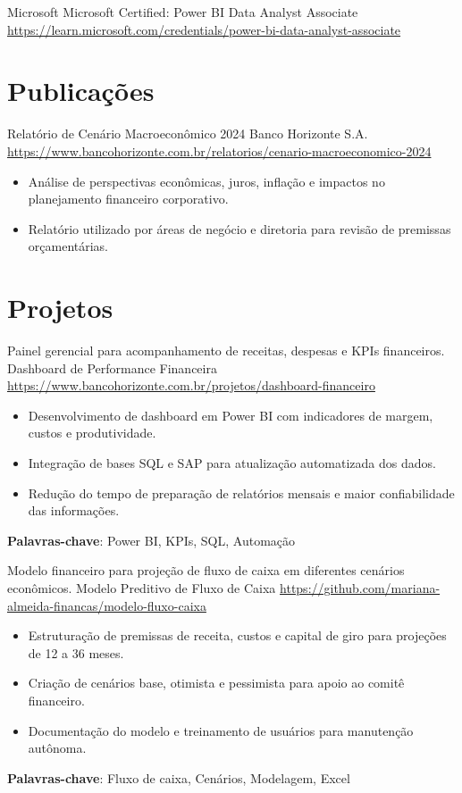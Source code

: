 \documentclass[a4paper, serif, 10pt]{moderncv}
\begin{document}
        {Microsoft}
        {Microsoft Certified: Power BI Data Analyst Associate}
        {\url{https://learn.microsoft.com/credentials/power-bi-data-analyst-associate}}
        {}
        {}
\section{Publicações}

        {Relatório de Cenário Macroeconômico 2024}
        {Banco Horizonte S.A.}
        {\url{https://www.bancohorizonte.com.br/relatorios/cenario-macroeconomico-2024}}
        {}
        {\begin{itemize}
\item Análise de perspectivas econômicas, juros, inflação e impactos no planejamento financeiro corporativo.
\item Relatório utilizado por áreas de negócio e diretoria para revisão de premissas orçamentárias.
\end{itemize}}
\section{Projetos}

        {Painel gerencial para acompanhamento de receitas, despesas e KPIs financeiros.}
        {Dashboard de Performance Financeira}
        {\url{https://www.bancohorizonte.com.br/projetos/dashboard-financeiro}}
        {}
        {\begin{itemize}
\item Desenvolvimento de dashboard em Power BI com indicadores de margem, custos e produtividade.
\item Integração de bases SQL e SAP para atualização automatizada dos dados.
\item Redução do tempo de preparação de relatórios mensais e maior confiabilidade das informações.
\end{itemize}
\textbf{Palavras-chave}: Power BI, KPIs, SQL, Automação}

        {Modelo financeiro para projeção de fluxo de caixa em diferentes cenários econômicos.}
        {Modelo Preditivo de Fluxo de Caixa}
        {\url{https://github.com/mariana-almeida-financas/modelo-fluxo-caixa}}
        {}
        {\begin{itemize}
\item Estruturação de premissas de receita, custos e capital de giro para projeções de 12 a 36 meses.
\item Criação de cenários base, otimista e pessimista para apoio ao comitê financeiro.
\item Documentação do modelo e treinamento de usuários para manutenção autônoma.
\end{itemize}
\textbf{Palavras-chave}: Fluxo de caixa, Cenários, Modelagem, Excel}
\end{document}
